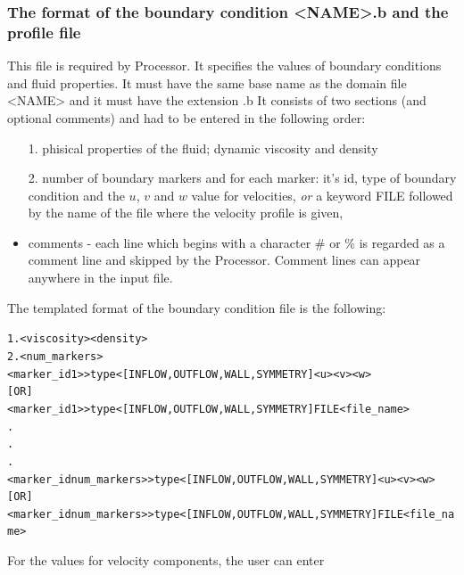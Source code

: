 \documentclass[10pt]{article}
\newcommand*{\tc}{\ttfamily} %
\newcommand*{\tn}{\sffamily} %
\begin{document}
    \subsubsection{The format of the boundary condition 
                   {\tc <NAME>.b} and the profile file}

    This file is required by {\tn Processor}. It specifies the
    values of boundary conditions and fluid properties. It must
    have the same base name as the domain file {\tc <NAME>}
    and it must have the extension {\tc .b}
    It consists of two sections (and optional comments) and had to 
    be entered in the 
    following order:
    \begin{itemize}
    \item[1.] phisical properties of the fluid; dynamic viscosity and
              density 
    \item[2.] number of boundary markers and
              for each marker: it's id, type of boundary condition
              and the $u$, $v$ and $w$ value for velocities, {\em or}
              a keyword {\tc FILE} followed by the name of the file  
              where the velocity profile is given,
    \item comments - each line which begins with a character {\tc \#}
          or {\tc \%} is regarded as a comment line and skipped by the
          {\tn Processor}. Comment lines can appear anywhere in the
          input file.
    \end{itemize}
    The templated format of the boundary condition file is the following:
    \small
    \begin{alltt}
    1. <viscosity> <density>
    2. <num_markers>
       <marker_id 1> >type<  [INFLOW,OUTFLOW,WALL,SYMMETRY]  <u> <v> <w>
       [OR]
       <marker_id 1> >type<  [INFLOW,OUTFLOW,WALL,SYMMETRY]  FILE <file_name> 
       .
       .
       .
       <marker_id num_markers> >type<  [INFLOW,OUTFLOW,WALL,SYMMETRY]  <u> <v> <w>
       [OR]
       <marker_id num_markers> >type<  [INFLOW,OUTFLOW,WALL,SYMMETRY]  FILE <file_name> 
    \end{alltt}
    \normalsize 
    For the values for velocity components, the user can enter 
\end{document}
